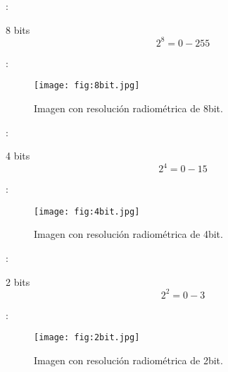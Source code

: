 \begin{frame}{\secname : \subsecname}
  \begin{block}{8 bits}
   \begin{equation}
            2^8 = 0-255
        \end{equation}
  \end{block}
\end{frame} 


\begin{frame}{\secname : \subsecname}
  \begin{figure}
    \centering
    \texttt{[image: fig:8bit.jpg]}
    \caption{Imagen con resolución radiométrica de 8bit.}
    \label{}
  \end{figure}
\end{frame}


\begin{frame}{\secname : \subsecname}
  \begin{block}{4 bits}
   \begin{equation}
            2^4 = 0-15
        \end{equation}
  \end{block}
\end{frame} 


\begin{frame}{\secname : \subsecname}
  \begin{figure}
    \centering
    \texttt{[image: fig:4bit.jpg]}
    \caption{Imagen con resolución radiométrica de 4bit.}
    \label{}
  \end{figure}
\end{frame}


\begin{frame}{\secname : \subsecname}
  \begin{block}{2 bits}
   \begin{equation}
            2^2 = 0-3
        \end{equation}
  \end{block}
\end{frame} 


\begin{frame}{\secname : \subsecname}
  \begin{figure}
    \centering
    \texttt{[image: fig:2bit.jpg]}
    \caption{Imagen con resolución radiométrica de 2bit.}
    \label{}
  \end{figure}
\end{frame}



